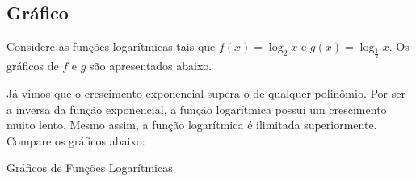 \subsection{Gráfico}

\begin{example}
    Considere as funções logarítmicas tais que $f(x) = \log_2 x$ e $g(x)
= \log_{\frac 1 2} x$. Os gráficos de $f$ e $g$ são apresentados
abaixo.
\end{example}

\begin{remark}
    Já vimos que o crescimento exponencial supera o de qualquer
polinômio. Por ser a inversa da função exponencial, a função
logarítmica possui um crescimento muito lento. Mesmo assim, a função
logarítmica é ilimitada superiormente. Compare os gráficos abaixo:
\end{remark}

\begin{onlineact}
    {Gráficos de Funções Logarítmicas}
\end{onlineact}